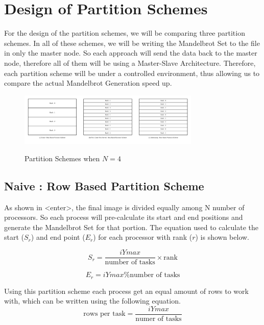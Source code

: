 \documentclass[conference]{IEEEtran}
\begin{document}
			
	\section{Design of Partition Schemes}
	For the design of the partition schemes, we will be comparing three partition schemes. In all of these schemes, we will be writing the Mandelbrot Set to the file in only the master node. So each approach will send the data back to the master node, therefore all of them will be using a Master-Slave Architecture. Therefore, each partition scheme will be under a controlled environment, thus allowing us to compare the actual Mandelbrot Generation speed up.
			\begin{figure}[h]
			\centering
			\includegraphics[width=3.4in]{P_SCHEME}  \label{Partition}
			\caption{Partition Schemes when $N=4$ }
		\end{figure}
			\subsection{Naive : Row Based Partition Scheme }\label{Naive}
			As shown in <enter>, the final image is divided equally among N number of processors. So each process will pre-calculate its start and end positions and generate the Mandelbrot Set for that portion. The equation used to calculate the start ($S_r$) and end point ($E_r$)  for each processor with rank ($r$) is shown below.
			
			\begin{equation}
			S_r = \frac{iYmax}{\text{number of tasks}} \times \text{rank}
			\end{equation}
			
			\begin{equation}
			E_r = iYmax {  } \%  {  }  \text{number of tasks}
			\end{equation}
			
			Using this partition scheme each process get an equal amount of rows to work with, which can be written using the following equation.
			\begin{equation}
				\label{rowsPerTask}
				\text{rows per task} = \frac{iYmax}{\text{numer of tasks}}
			\end{equation}
			
\end{document}
